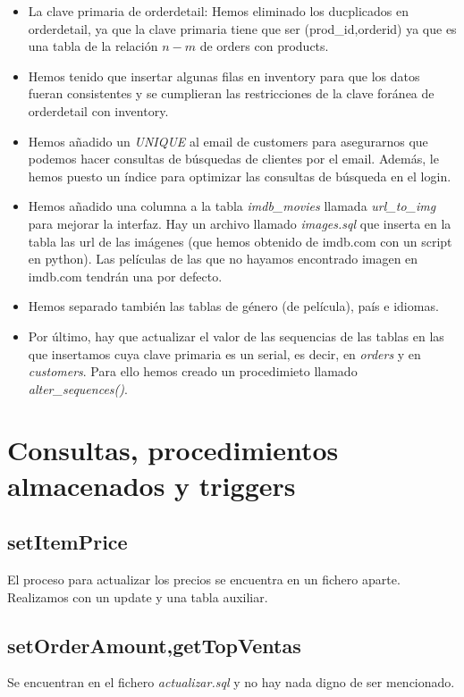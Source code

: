 \documentclass[nochap]{apuntes}
\begin{document}
\begin{itemize}

\item La clave primaria de orderdetail: Hemos eliminado los ducplicados en orderdetail, ya que la clave primaria  tiene que ser (prod\_id,orderid) ya que es una tabla de la relación $n-m$ de orders con products. 

\item Hemos tenido que insertar algunas filas en inventory para que los datos fueran consistentes y se cumplieran las restricciones de la clave foránea de orderdetail con inventory.

\item Hemos añadido un \textit{UNIQUE} al email de customers para asegurarnos que podemos hacer consultas de búsquedas de clientes por el email. Además, le hemos puesto un índice para optimizar las consultas de búsqueda en el login.

\item Hemos añadido una columna a la tabla \textit{imdb\_movies} llamada \textit{url\_to\_img} para mejorar la interfaz. Hay un archivo llamado \textit{images.sql} que inserta en la tabla las url de las imágenes (que hemos obtenido de imdb.com con un script en python). Las películas de las que no hayamos encontrado imagen en imdb.com tendrán una por defecto.

\item Hemos separado también las tablas de género (de película), país e idiomas. 

\item Por último, hay que actualizar el valor de las sequencias de las tablas en las que insertamos cuya clave primaria es un serial, es decir, en \textit{orders} y en \textit{customers}. Para ello hemos creado un procedimieto llamado \textit{alter\_sequences()}.
\end{itemize}



\section{Consultas, procedimientos almacenados y triggers}
\subsection{setItemPrice}
El proceso para actualizar los precios se encuentra en un fichero aparte. Realizamos con un update y una tabla auxiliar.
\subsection{setOrderAmount,getTopVentas}
Se encuentran en el fichero \textit{actualizar.sql} y no hay nada digno de ser mencionado.
\end{document}
